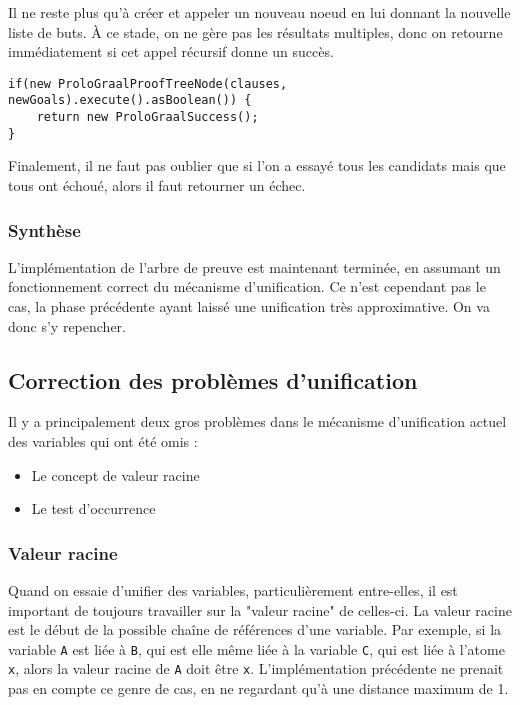 \documentclass[../report.tex]{subfiles}
\begin{document}
Il ne reste plus qu'à créer et appeler un nouveau noeud en lui donnant la nouvelle liste de buts. À ce stade, on ne gère pas les résultats multiples, donc on retourne immédiatement si cet appel récursif donne un succès.
\begin{verbatim}
if(new ProloGraalProofTreeNode(clauses, newGoals).execute().asBoolean()) {
    return new ProloGraalSuccess();
}
\end{verbatim}
Finalement, il ne faut pas oublier que si l'on a essayé tous les candidats mais que tous ont échoué, alors il faut retourner un échec.
\subsubsection{Synthèse}
L'implémentation de l'arbre de preuve est maintenant terminée, en assumant un fonctionnement correct du mécanisme d'unification. Ce n'est cependant pas le cas, la phase précédente ayant laissé une unification très approximative. On va donc s'y repencher.
\subsection{Correction des problèmes d'unification}\label{subsec:unificationfixes}
Il y a principalement deux gros problèmes dans le mécanisme d'unification actuel des variables qui ont été omis :
\begin{itemize}
    \item Le concept de valeur racine
    \item Le test d'occurrence
\end{itemize}
\subsubsection{Valeur racine}
Quand on essaie d'unifier des variables, particulièrement entre-elles, il est important de toujours travailler sur la "valeur racine" de celles-ci. La valeur racine est le début de la possible chaîne de références d'une variable. Par exemple, si la variable \texttt{A} est liée à \texttt{B}, qui est elle même liée à la variable \texttt{C}, qui est liée à l'atome \texttt{x}, alors la valeur racine de \texttt{A} doit être \texttt{x}. L'implémentation précédente ne prenait pas en compte ce genre de cas, en ne regardant qu'à une distance maximum de 1. 
\end{document}
